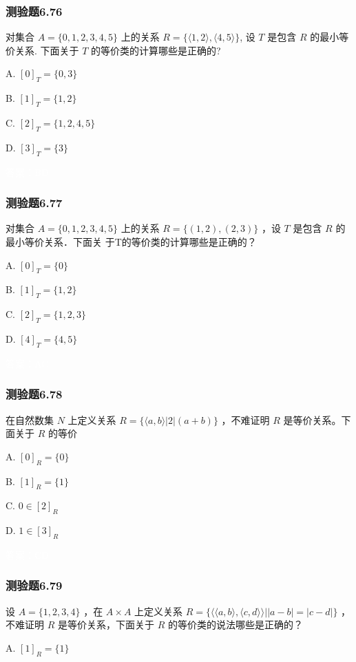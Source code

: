 \documentclass[UTF8, heading=true]{ctexart}
\begin{document}
\subsubsection{测验题6.76}

对集合 $A=\{0,1,2,3,4,5\}$ 上的关系 $R=\{\langle 1,2\rangle,\langle 4,5\rangle \}$, 设 $T$ 是包含 $R$ 的最小等价关系. 下面关于 $T$ 的等价类的计算哪些是正确的?

A. $[0]_T=\{0,3\}$

B. $[1]_T=\{1,2\}$

C. $[2]_T=\{1,2,4,5\}$

D. $[3]_T=\{3\}$

\textcolor{white}{答案：BD}

\subsubsection{测验题6.77}

对集合 $A=\{0,1,2,3,4,5\}$ 上的关系 $R=\{(1,2),(2,3)\}$ ，设 $T$ 是包含 $R$ 的最小等价关系．下面关
于T的等价类的计算哪些是正确的？

A. $[0]_T=\{0\}$

B. $[1]_T=\{1,2\}$


C. $[2]_T=\{1,2,3\}$

D. $[4]_T=\{4,5\}$


\textcolor{white}{答案：AC}

\subsubsection{测验题6.78}

在自然数集 $N$ 上定义关系 $R=\{\langle a, b\rangle|2|(a+b)\}$ ，不难证明 $R$ 是等价关系。下面关于 $R$ 的等价

A. $[0]_R=\{0\}$

B. $[1]_R=\{1\}$

C. $0 \in[2]_R$

D. $1 \in[3]_R$

\textcolor{white}{答案：CD}

\subsubsection{测验题6.79}

设 $A=\{1,2,3,4\}$ ，在 $A \times A$ 上定义关系 $R=\{\langle\langle a, b\rangle,\langle c, d\rangle\rangle| | a-b|=|c-d|\}$ ，不难证明 $R$ 是等价关系，下面关于 $R$ 的等价类的说法哪些是正确的？

A. $[1]_R=\{1\}$
\end{document}
